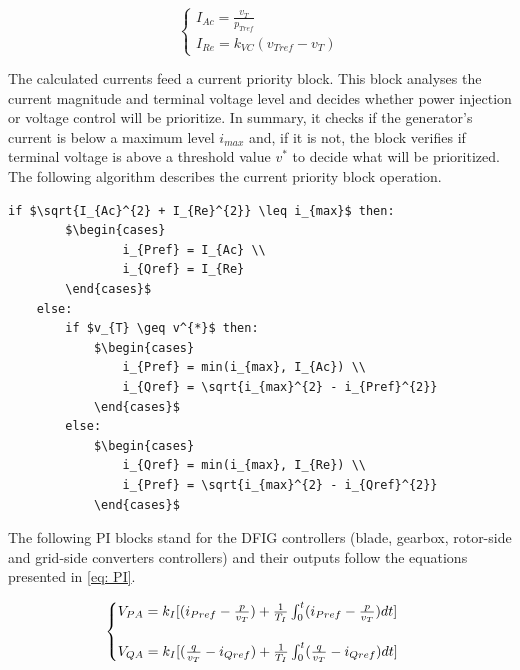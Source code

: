 \begin{equation}
	\begin{cases}
		I_{Ac} = \frac{v_{T}}{p_{Tref}} \\
		I_{Re} = k_{VC}(v_{Tref} - v_{T})
	\end{cases}
	\label{eq: Currents}
\end{equation}

The calculated currents feed a current priority block. This block analyses the current magnitude and terminal voltage level and decides whether power injection or voltage control will be prioritize. In summary, it checks if the generator's current is below a maximum level $i_{max}$ and, if it is not, the block verifies if terminal voltage is above a threshold value $v^{*}$ to decide what will be prioritized. The following algorithm describes the current priority block operation.

\begin{center}
	\begin{lstlisting}[mathescape, columns=fullflexible]
	if $\sqrt{I_{Ac}^{2} + I_{Re}^{2}} \leq i_{max}$ then:
		$\begin{cases}
				i_{Pref} = I_{Ac} \\
				i_{Qref} = I_{Re}
		\end{cases}$
	else:
		if $v_{T} \geq v^{*}$ then:	
			$\begin{cases}
				i_{Pref} = min(i_{max}, I_{Ac}) \\
				i_{Qref} = \sqrt{i_{max}^{2} - i_{Pref}^{2}}
			\end{cases}$
		else:
			$\begin{cases}
				i_{Qref} = min(i_{max}, I_{Re}) \\
				i_{Pref} = \sqrt{i_{max}^{2} - i_{Qref}^{2}}
			\end{cases}$
	\end{lstlisting}
\end{center}

The following PI blocks stand for the DFIG controllers (blade, gearbox, rotor-side and grid-side converters controllers) and their outputs follow the equations presented in \eqref{eq: PI}.

\begin{equation}
	\begin{cases}
		V_{PA} = k_{I}[(i_{Pref} - \frac{p}{v_{T}}) +\frac{1}{T_{I}}\int\displaylimits_{0}^{t}	(i_{Pref} - \frac{p}{v_{T}})dt]\\
		\\
		V_{QA} = k_{I}[(\frac{q}{v_{T}} - i_{Qref}) +\frac{1}{T_{I}}\int\displaylimits_{0}^{t}	(\frac{q}{v_{T}} - i_{Qref})dt]
	\end{cases}
	\label{eq: PI}
\end{equation}

